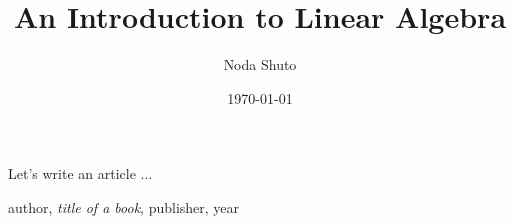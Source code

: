 \documentclass[a4paper,11pt]{book}
\begin{document}
\title{An Introduction to Linear Algebra}
\author{Noda Shuto}
\date{\today}
\maketitle
Let's write an article ...





\begin{thebibliography}{99}
 author, \emph{title of a book}, publisher, year
\end{thebibliography}
\end{document}
